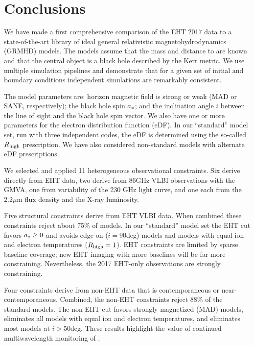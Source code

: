 \section{Conclusions}
\label{sec:conclusions}

We have made a first comprehensive comparison of the EHT 2017 \sgra data to a state-of-the-art library of ideal general relativistic magnetohydrodynamics (GRMHD) models.  The models assume that the mass and distance to \sgra are known and that the central object is a black hole described by the Kerr metric. We use multiple simulation pipelines and demonstrate that for a given set of initial and boundary conditions independent simulations are remarkably consistent.  

The model parameters are: horizon magnetic field is strong or weak (MAD or SANE, respectively); the black hole spin $a_*$; and the inclination angle $i$ between the line of sight and the black hole spin vector.  We also have one or more parameters for the electron distribution function (eDF).  In our ``standard'' model set, run with three independent codes, the eDF is determined using the so-called $R_\mathrm{high}$ prescription.  We have also considered non-standard models with alternate eDF prescriptions.   

We selected and applied 11 heterogeneous observational constraints.  Six derive directly from EHT data, two derive from 86GHz VLBI observations with the GMVA, one from variability of the 230 GHz light curve, and one each from the $2.2\mu$m flux density and the X-ray luminosity.  

Five structural constraints derive from EHT VLBI data.  When combined these constraints reject about 75\% of models.  In our ``standard'' model set the EHT cut favors $a_* \ge 0$ and avoids edge-on ($i = 90$deg) models and models with equal ion and electron temperatures ($R_\mathrm{high} = 1$).  EHT constraints are limited by sparse baseline coverage; new EHT imaging with more baselines will be far more constraining.  Nevertheless, the 2017  EHT-only observations are strongly constraining.

Four constraints derive from non-EHT data that is contemporaneous or near-contemporaneous.  Combined, the non-EHT constraints reject 88\% of the standard models.  The non-EHT cut favors strongly magnetized (MAD) models, eliminates all models with equal ion and electron temperatures, and eliminates most models at $i > 50$deg.  These results highlight the value of continued multiwavelength monitoring of \sgra.

